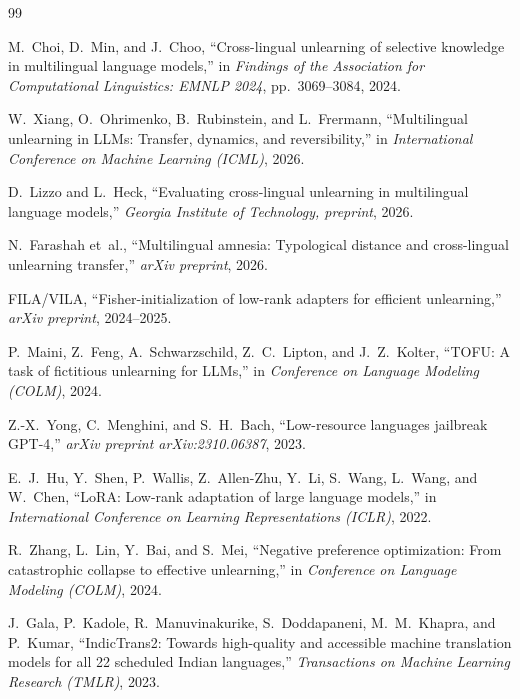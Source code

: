 \documentclass[11pt,a4paper]{article}
\begin{document}
\begin{thebibliography}{99}
\small
\setlength{\itemsep}{2.5pt}
\setlength{\parskip}{0pt}

M.~Choi, D.~Min, and J.~Choo,
``Cross-lingual unlearning of selective knowledge in multilingual language models,''
in \emph{Findings of the Association for Computational Linguistics: EMNLP 2024}, pp.~3069--3084, 2024.

W.~Xiang, O.~Ohrimenko, B.~Rubinstein, and L.~Frermann,
``Multilingual unlearning in LLMs: Transfer, dynamics, and reversibility,''
in \emph{International Conference on Machine Learning (ICML)}, 2026.

D.~Lizzo and L.~Heck,
``Evaluating cross-lingual unlearning in multilingual language models,''
\emph{Georgia Institute of Technology, preprint}, 2026.

N.~Farashah et~al.,
``Multilingual amnesia: Typological distance and cross-lingual unlearning transfer,''
\emph{arXiv preprint}, 2026.

FILA/VILA,
``Fisher-initialization of low-rank adapters for efficient unlearning,''
\emph{arXiv preprint}, 2024--2025.

P.~Maini, Z.~Feng, A.~Schwarzschild, Z.~C.~Lipton, and J.~Z.~Kolter,
``TOFU: A task of fictitious unlearning for LLMs,''
in \emph{Conference on Language Modeling (COLM)}, 2024.

Z.-X.~Yong, C.~Menghini, and S.~H.~Bach,
``Low-resource languages jailbreak GPT-4,''
\emph{arXiv preprint arXiv:2310.06387}, 2023.

E.~J.~Hu, Y.~Shen, P.~Wallis, Z.~Allen-Zhu, Y.~Li, S.~Wang, L.~Wang, and W.~Chen,
``LoRA: Low-rank adaptation of large language models,''
in \emph{International Conference on Learning Representations (ICLR)}, 2022.

R.~Zhang, L.~Lin, Y.~Bai, and S.~Mei,
``Negative preference optimization: From catastrophic collapse to effective unlearning,''
in \emph{Conference on Language Modeling (COLM)}, 2024.

J.~Gala, P.~Kadole, R.~Manuvinakurike, S.~Doddapaneni, M.~M.~Khapra, and P.~Kumar,
``IndicTrans2: Towards high-quality and accessible machine translation models for all 22 scheduled Indian languages,''
\emph{Transactions on Machine Learning Research (TMLR)}, 2023.


\end{thebibliography}
\end{document}
